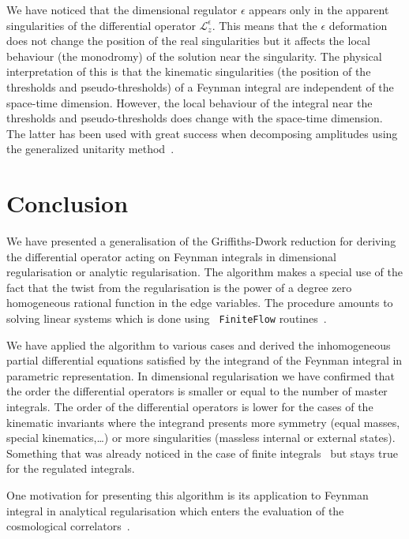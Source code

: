 \documentclass[a4paper,12pt]{article}
\numberwithin{equation}{section}
\numberwithin{figure}{section}
\begin{document}
We have noticed that the dimensional regulator $\epsilon$ appears only in  the
apparent singularities of the differential operator
$\mathscr{L}_z^\epsilon$. This means that the  $\epsilon$ deformation
does not change the position of the real singularities but it affects
the local behaviour (the monodromy) of the solution near the
singularity.
%
The physical interpretation of this is that the kinematic
singularities (the position of the thresholds
and pseudo-thresholds) of a Feynman integral are independent of the
space-time dimension. However,  the local behaviour of the integral near
the thresholds and pseudo-thresholds does change with the space-time
dimension. The latter has been used with great success
when decomposing amplitudes using the generalized unitarity method~\cite{Bern:2011qt}.

\section{Conclusion}\label{sec:conclusion}
We have presented a generalisation of the Griffiths-Dwork reduction
for deriving the differential operator acting on Feynman integrals in
dimensional regularisation or analytic regularisation. The algorithm
makes a special use of the fact that the twist from the regularisation
is the power of a degree zero homogeneous rational function in the
edge variables. The procedure amounts to
solving linear systems which is done using {\tt
  FiniteFlow} routines~\cite{Peraro:2019svx}.

We have applied the algorithm to various cases and derived the
inhomogeneous partial differential equations satisfied by the integrand of the Feynman integral in parametric representation.
In dimensional regularisation we have confirmed that the order the
differential operators is smaller or equal to the number of master
integrals. The order of the differential operators is lower for the cases of the kinematic invariants where the integrand
presents more symmetry (equal masses, special kinematics,\dots) or
more singularities (massless internal or external states). Something
that was already noticed in the case of finite integrals~\cite{Lairez:2022zkj}  but stays
true for the regulated integrals.

One motivation for presenting this algorithm is its application to
Feynman integral in analytical regularisation which enters the evaluation of the cosmological
correlators~\cite{Heckelbacher:2022hbq,Chowdhury:2023khl,Chowdhury:2023arc}. 
\end{document}
